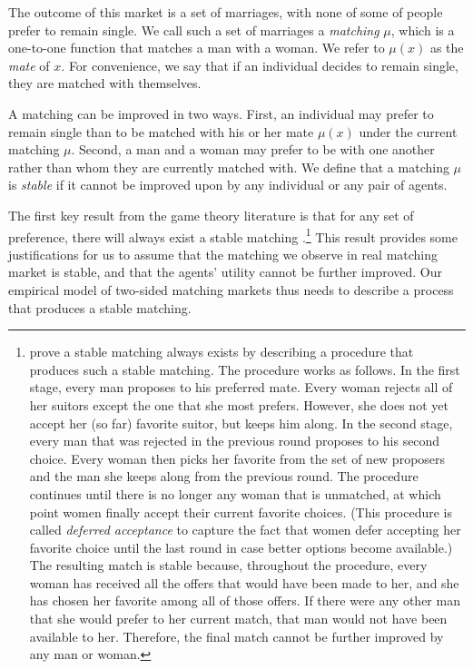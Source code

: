 The outcome of this market is a set of marriages, with none of some of people
prefer to remain single. We call such a set of marriages a \textit{matching}
$\mu$, which is a one-to-one function that matches a man with a woman. We refer
to $\mu(x)$ as the \textit{mate} of $x$. For convenience, we say that if an
individual decides to remain single, they are matched with themselves.

A matching can be improved in two ways. First, an individual may prefer to
remain single than to be matched with his or her mate $\mu(x)$ under the current
matching $\mu$. Second, a man and a woman may prefer to be with one another
rather than whom they are currently matched with. We define that a matching
$\mu$ is \textit{stable} if it cannot be improved upon by any individual or any
pair of agents.

The first key result from the game theory literature is that for any set of
preference, there will always exist a stable matching
\citep{Gale1962}.\footnote{\citet{Gale1962} prove a stable matching always
  exists by describing a procedure that produces such a stable matching. The
  procedure works as follows. In the first stage, every man proposes to his
  preferred mate. Every woman rejects all of her suitors except the one that she
  most prefers. However, she does not yet accept her (so far) favorite suitor,
  but keeps him along. In the second stage, every man that was rejected in the
  previous round proposes to his second choice. Every woman then picks her
  favorite from the set of new proposers and the man she keeps along from the
  previous round. The procedure continues until there is no longer any woman
  that is unmatched, at which point women finally accept their current favorite
  choices. (This procedure is called \textit{deferred acceptance} to capture the
  fact that women defer accepting her favorite choice until the last round in
  case better options become available.) The resulting match is stable because,
  throughout the procedure, every woman has received all the offers that would
  have been made to her, and she has chosen her favorite among all of those
  offers. If there were any other man that she would prefer to her current
  match, that man would not have been available to her. Therefore, the final
  match cannot be further improved by any man or woman.} This result provides
some justifications for us to assume that the matching we observe in real
matching market is stable, and that the agents' utility cannot be further
improved. Our empirical model of two-sided matching markets thus needs to
describe a process that produces a stable matching.

